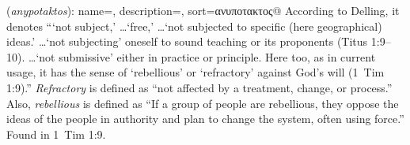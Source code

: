 \item[Rebellious,]

(\textit{anypotaktos}):
{
    name=,
    description={},
    sort=ανυποτακτος@
}
According to Delling, it denotes ```not subject,' \ldots `free,' \ldots `not subjected to specific (here geographical) ideas.' \ldots `not subjecting' oneself to sound teaching or its proponents (Titus 1:9--10). \ldots`not submissive' either in practice or principle. Here too, as in current usage, it has the sense of `rebellious' or `refractory' against God's will (1~Tim 1:9).''
\emph{Refractory} is defined as ``not affected by a treatment, change, or process.'' Also, \emph{rebellious} is defined as ``If a group of people are rebellious, they oppose the ideas of the people in authority and plan to change the system, often using force.''
Found in 1~Tim 1:9.
